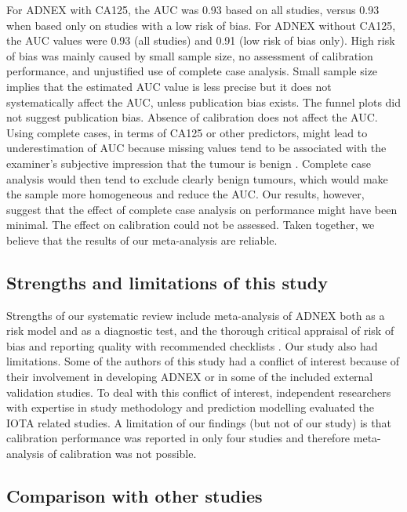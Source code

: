 For ADNEX with CA125, the AUC was 0.93 based on all studies, versus 0.93 when based only on studies with a low risk of bias. For ADNEX without CA125, the AUC values were 0.93 (all studies) and 0.91 (low risk of bias only). High risk of bias was mainly caused by small sample size, no assessment of calibration performance, and unjustified use of complete case analysis. Small sample size implies that the estimated AUC value is less precise but it does not systematically affect the AUC, unless publication bias exists. The funnel plots did not suggest publication bias. Absence of calibration does not affect the AUC. Using complete cases, in terms of CA125 or other predictors, might lead to underestimation of AUC because missing values tend to be associated with the examiner's subjective impression that the tumour is benign
 \cite{landolfoBenignDescriptorsADNEX2023}. Complete case analysis would then tend to exclude clearly benign tumours, which would make the sample more homogeneous and reduce the AUC. Our results, however, suggest that the effect of complete case analysis on performance might have been minimal. The effect on calibration could not be assessed. Taken together, we believe that the results of our meta-analysis are reliable.

 \subsection{Strengths and limitations of this study}

Strengths of our systematic review include meta-analysis of ADNEX both as a risk model and as a diagnostic test, and the thorough critical appraisal of risk of bias and reporting quality with recommended checklists \cite{wolffPROBASTToolAssess2019,collinsTransparentReportingMultivariable2015}.
Our study also had limitations. Some of the authors of this study had a conflict of interest because of their involvement in developing ADNEX or in some of the included external validation studies. To deal with this conflict of interest, independent researchers with expertise in study methodology and prediction modelling evaluated the IOTA related studies. A limitation of our findings (but not of our study) is that calibration performance was reported in only four studies and therefore meta-analysis of calibration was not possible.

\subsection{Comparison with other studies}

